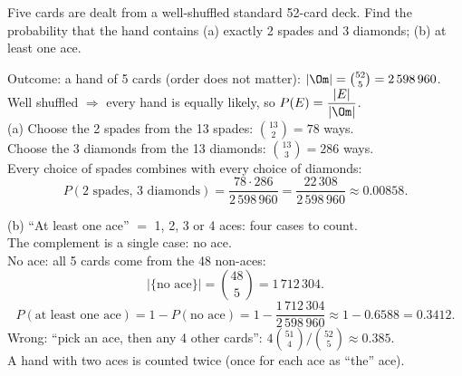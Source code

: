 
\begin{problem}
	Five cards are dealt from a well-shuffled standard 52-card deck. Find the
	probability that the hand contains
	(a) exactly 2 spades and 3 diamonds;
	(b) at least one ace.
\end{problem}

\begin{slides}
	\small
	\exstatement
	\pause
	\sol Outcome: a hand of 5 cards (order does not matter):
	$|\Om|=\binom{52}{5}=2\,598\,960$.
	\pause\\[1mm]
	Well shuffled $\Rightarrow$ every hand is equally likely, so
	$P(E)=\dfrac{|E|}{|\Om|}$.
	\pause\\[1mm]
	(a) Choose the 2 spades from the 13 spades: $\binom{13}{2}=78$ ways.
	\pause\\
	Choose the 3 diamonds from the 13 diamonds: $\binom{13}{3}=286$ ways.
	\pause\\
	Every choice of spades combines with every choice of diamonds:
	\[ P(\text{2 spades, 3 diamonds})=\frac{78\cdot286}{2\,598\,960}
		=\frac{22\,308}{2\,598\,960}\approx0.00858. \]
\end{slides}

\begin{slides}
	\small
	(b) ``At least one ace'' $=$ 1, 2, 3 or 4 aces: four cases to count.
	\pause\\
	The complement is a single case: \alert{no ace}.
	\pause\\
	No ace: all 5 cards come from the 48 non-aces:
	\[ |\{\text{no ace}\}|=\binom{48}{5}=1\,712\,304. \]
	\pause
	\[ P(\text{at least one ace})=1-P(\text{no ace})
		=1-\frac{1\,712\,304}{2\,598\,960}\approx1-0.6588=0.3412. \]
	\pause
	\alert{Wrong:} ``pick an ace, then any 4 other cards'':
	$4\binom{51}{4}\big/\binom{52}{5}\approx0.385$.\\
	A hand with two aces is counted twice (once for each ace as ``the'' ace).
\end{slides}


